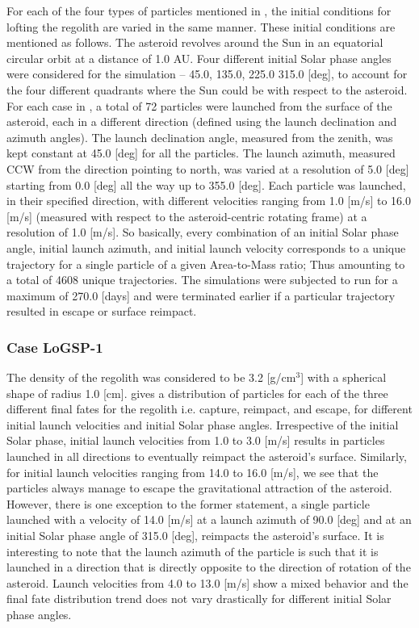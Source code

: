 For each of the four types of particles mentioned in , the initial conditions for lofting the regolith are varied in the same manner. These initial conditions are mentioned as follows. The asteroid revolves around the Sun in an equatorial circular orbit at a distance of 1.0 \gls{AU}. Four different initial Solar phase angles were considered for the simulation – 45.0, 135.0, 225.0 315.0 [deg], to account for the four different quadrants where the Sun could be with respect to the asteroid. For each case in , a total of 72 particles were launched from the surface of the asteroid, each in a different direction (defined using the launch declination and azimuth angles). The launch declination angle, measured from the zenith, was kept constant at 45.0 [deg] for all the particles. The launch azimuth, measured \gls{CCW} from the direction pointing to north, was varied at a resolution of 5.0 [deg] starting from 0.0 [deg] all the way up to 355.0 [deg]. Each particle was launched, in their specified direction, with different velocities ranging from 1.0 [m/s] to 16.0 [m/s] (measured with respect to the asteroid-centric rotating frame) at a resolution of 1.0 [m/s]. So basically, every combination of an initial Solar phase angle, initial launch azimuth, and initial launch velocity corresponds to a unique trajectory for a single particle of a given Area-to-Mass ratio; Thus amounting to a total of 4608 unique trajectories. The simulations were subjected to run for a maximum of 270.0 [days] and were terminated earlier if a particular trajectory resulted in escape or surface reimpact.

\subsubsection{Case LoGSP-1}
\label{LoGSP-1}
The density of the regolith was considered to be 3.2 [g/cm$^{3}$] with a spherical shape of radius 1.0 [cm].  gives a distribution of particles for each of the three different final fates for the regolith i.e. capture, reimpact, and escape, for different initial launch velocities and initial Solar phase angles. Irrespective of the initial Solar phase, initial launch velocities from 1.0 to 3.0 [m/s] results in particles launched in all directions to eventually reimpact the asteroid's surface. Similarly, for initial launch velocities ranging from 14.0 to 16.0 [m/s], we see that the particles always manage to escape the gravitational attraction of the asteroid. However, there is one exception to the former statement, a single particle launched with a velocity of 14.0 [m/s] at a launch azimuth of 90.0 [deg] and at an initial Solar phase angle of 315.0 [deg], reimpacts the asteroid's surface. It is interesting to note that the launch azimuth of the particle is such that it is launched in a direction that is directly opposite to the direction of rotation of the asteroid. Launch velocities from 4.0 to 13.0 [m/s] show a mixed behavior and the final fate distribution trend does not vary drastically for different initial Solar phase angles.

